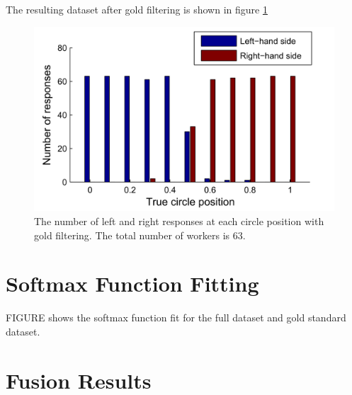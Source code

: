 The resulting dataset after gold filtering is shown in figure \ref{Figure:bar_gold_responsesLR}


\begin{figure}
	\centering
	\includegraphics[scale=1]{bar_gold_responsesLR.png}
	\caption{The number of left and right responses at each circle position with gold filtering. The total number of workers is 63.}
	\label{Figure:bar_gold_responsesLR}
\end{figure}


\section{Softmax Function Fitting}

FIGURE shows the softmax function fit for the full dataset and gold standard dataset.



\section{Fusion Results}

